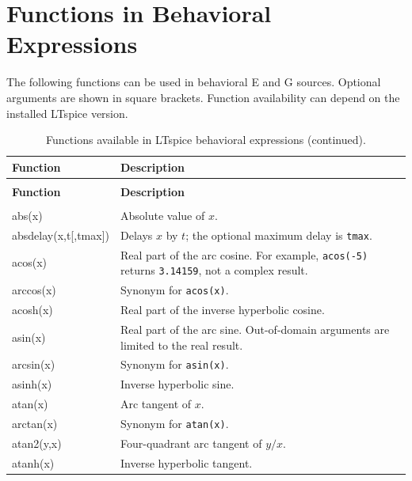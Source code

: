 \section{Functions in Behavioral Expressions}
\label{sec:behavioral-functions}

The following functions can be used in behavioral E and G sources. Optional
arguments are shown in square brackets. Function availability can depend on the
installed LTspice version.

\begingroup
\small
\setlength{\LTpre}{0pt}
\setlength{\LTpost}{6pt}
\renewcommand{\arraystretch}{1.12}
\begin{longtable}{>{\ttfamily\raggedright\arraybackslash}p{}
                  >{\raggedright\arraybackslash}p{}}
\caption{Functions available in LTspice behavioral expressions.}
\label{tab:ltspice-behavioral-functions}\\
\toprule
\normalfont\bfseries Function & \bfseries Description \\
\midrule
\endfirsthead
\caption[]{Functions available in LTspice behavioral expressions (continued).}\\
\toprule
\normalfont\bfseries Function & \bfseries Description \\
\midrule
\endhead
\midrule
\multicolumn{2}{r}{\small Continued on next page}\\
\endfoot
\bottomrule
\endlastfoot
abs(x) & Absolute value of $x$. \\
absdelay(x,t[,tmax]) & Delays $x$ by $t$; the optional maximum delay is \texttt{tmax}. \\
acos(x) & Real part of the arc cosine. For example, \texttt{acos(-5)} returns \texttt{3.14159}, not a complex result. \\
arccos(x) & Synonym for \texttt{acos(x)}. \\
acosh(x) & Real part of the inverse hyperbolic cosine. \\
asin(x) & Real part of the arc sine. Out-of-domain arguments are limited to the real result. \\
arcsin(x) & Synonym for \texttt{asin(x)}. \\
asinh(x) & Inverse hyperbolic sine. \\
atan(x) & Arc tangent of $x$. \\
arctan(x) & Synonym for \texttt{atan(x)}. \\
atan2(y,x) & Four-quadrant arc tangent of $y/x$. \\
atanh(x) & Inverse hyperbolic tangent. \\

\end{longtable}
